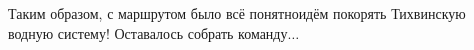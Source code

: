 Таким образом, с маршрутом было всё понятно\mdash идём покорять Тихвинскую водную систему! Оставалось собрать команду$\ldots$

\begin{center}
\end{center}
